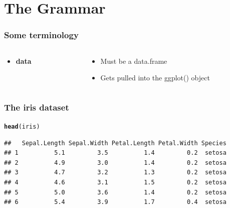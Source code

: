 \documentclass{beamer}\usepackage[]{graphicx}\usepackage[]{color}
\makeatletter
\newcommand{\hlstd}[1]{\textcolor[rgb]{0.345,0.345,0.345}{#1}}%
\newcommand{\hlkwd}[1]{\textcolor[rgb]{0.737,0.353,0.396}{\textbf{#1}}}%
\newenvironment{kframe}{%
 \def\at@end@of@kframe{}%
 \ifinner\ifhmode%
  \def\at@end@of@kframe{\end{minipage}}%
  \begin{minipage}{\columnwidth}%
 \fi\fi%
 \def\FrameCommand##1{\hskip\@totalleftmargin \hskip-\fboxsep
 \colorbox{shadecolor}{##1}\hskip-\fboxsep
     \hskip-\linewidth \hskip-\@totalleftmargin \hskip\columnwidth}%
 \MakeFramed {\advance\hsize-\width
   \@totalleftmargin\z@ \linewidth\hsize
   \@setminipage}}%
 {\par\unskip\endMakeFramed%
 \at@end@of@kframe}
\newenvironment{knitrout}{}{} %
\makeatother
\begin{document}
\section*{The Grammar}
\frame{\sectionpage}


\begin{frame}[fragile]
\frametitle{Some terminology}
\begin{columns}[t]

\begin{column}[T]{3cm}
\begin{itemize}
    \item \textbf{data}
\end{itemize}
\end{column}

\begin{column}[T]{8cm}
\begin{itemize}
    \item Must be a data.frame
    \item Gets pulled into the ggplot() object
\end{itemize}
\end{column}

\end{columns}
\end{frame}


\begin{frame}[fragile]
\frametitle{The iris dataset}
\begin{knitrout}\footnotesize
{}\color{fgcolor}\begin{kframe}
\begin{alltt}
\hlkwd{head}\hlstd{(iris)}
\end{alltt}
\begin{verbatim}
##   Sepal.Length Sepal.Width Petal.Length Petal.Width Species
## 1          5.1         3.5          1.4         0.2  setosa
## 2          4.9         3.0          1.4         0.2  setosa
## 3          4.7         3.2          1.3         0.2  setosa
## 4          4.6         3.1          1.5         0.2  setosa
## 5          5.0         3.6          1.4         0.2  setosa
## 6          5.4         3.9          1.7         0.4  setosa
\end{verbatim}
\end{kframe}
\end{knitrout}
\end{frame}
\end{document}
